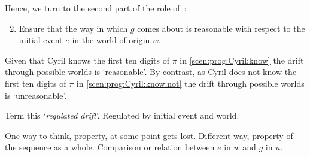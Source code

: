 \begin{note}
  Hence, we turn to the second part of the role of~\AlgFindBranches{}:
  \begin{enumerate}[label=\arabic*., ref=(\arabic*), noitemsep]
  \setcounter{enumi}{1}
  \item
    Ensure that the way in which \(g\) comes about is reasonable with respect to the initial event \(e\) in the world of origin \(w\).
  \end{enumerate}
  Given that Cyril knows the first ten digits of \(\pi\) in \autoref{scen:prog:Cyril:know} the drift through possible worlds is `reasonable'.
  By contrast, as Cyril does not know the first ten digits of \(\pi\) in \autoref{scen:prog:Cyril:know:not} the drift through possible worlds is `unreasonable'.

  Term this `\emph{regulated drift}'.
  Regulated by initial event and world.

  One way to think, property, at some point gets lost.
  Different way, property of the sequence as a whole.
  Comparison or relation between \(e\) in \(w\) and \(g\) in \(u\).
\end{note}


